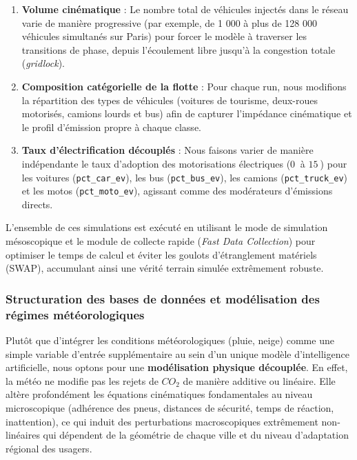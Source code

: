 \documentclass[10pt, a4paper]{article}
\providecommand{\tightlist}{}
\begin{document}
\begin{enumerate}
\def\labelenumi{\arabic{enumi}.}
\tightlist
\item
  \textbf{Volume cinématique} : Le nombre total de véhicules injectés
  dans le réseau varie de manière progressive (par exemple, de 1 000 à
  plus de 128 000 véhicules simultanés sur Paris) pour forcer le modèle
  à traverser les transitions de phase, depuis l'écoulement libre
  jusqu'à la congestion totale (\emph{gridlock}).
\item
  \textbf{Composition catégorielle de la flotte} : Pour chaque run, nous
  modifions la répartition des types de véhicules (voitures de tourisme,
  deux-roues motorisés, camions lourds et bus) afin de capturer
  l'impédance cinématique et le profil d'émission propre à chaque
  classe.
\item
  \textbf{Taux d'électrification découplés} : Nous faisons varier de
  manière indépendante le taux d'adoption des motorisations électriques
  (\(0\ %
  \) à \(15\ %
  \)) pour les voitures (\texttt{pct\_car\_ev}), les bus
  (\texttt{pct\_bus\_ev}), les camions (\texttt{pct\_truck\_ev}) et les
  motos (\texttt{pct\_moto\_ev}), agissant comme des modérateurs
  d'émissions directs.
\end{enumerate}

L'ensemble de ces simulations est exécuté en utilisant le mode de
simulation mésoscopique et le module de collecte rapide (\emph{Fast Data
Collection}) pour optimiser le temps de calcul et éviter les goulots
d'étranglement matériels (SWAP), accumulant ainsi une vérité terrain
simulée extrêmement robuste.

\subsubsection{Structuration des bases de données et modélisation des
régimes
météorologiques}\label{structuration-des-bases-de-donnuxe9es-et-moduxe9lisation-des-ruxe9gimes-muxe9tuxe9orologiques}

Plutôt que d'intégrer les conditions météorologiques (pluie, neige)
comme une simple variable d'entrée supplémentaire au sein d'un unique
modèle d'intelligence artificielle, nous optons pour une
\textbf{modélisation physique découplée}. En effet, la météo ne modifie
pas les rejets de \(CO_2\) de manière additive ou linéaire. Elle altère
profondément les équations cinématiques fondamentales au niveau
microscopique (adhérence des pneus, distances de sécurité, temps de
réaction, inattention), ce qui induit des perturbations macroscopiques
extrêmement non-linéaires qui dépendent de la géométrie de chaque ville
et du niveau d'adaptation régional des usagers.
\end{document}
